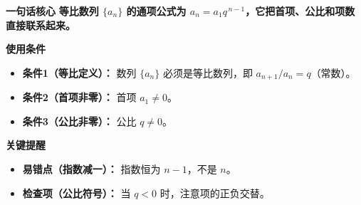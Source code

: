 \begin{summarybox}
	\textbf{\textcolor{CSummary}{一句话核心}}
	\textbf{等比数列 $\{a_n\}$ 的通项公式为 $a_n = a_1 q^{\,n-1}$，它把首项、公比和项数直接联系起来。}

	\medskip
	\textbf{\textcolor{CSummary}{使用条件}}
	\begin{itemize}[leftmargin=*, itemsep=0.5em, topsep=0.4em]
		\item \textbf{条件1（等比定义）：} 数列 $\{a_n\}$ 必须是等比数列，即 $a_{n+1} / a_n = q$（常数）。
		\item \textbf{条件2（首项非零）：} 首项 $a_1 \neq 0$。
		\item \textbf{条件3（公比非零）：} 公比 $q \neq 0$。
	\end{itemize}

	\medskip
	\textbf{\textcolor{CSummary}{关键提醒}}
	\begin{itemize}[leftmargin=*, itemsep=0.5em, topsep=0.4em]
		\item \textbf{易错点（指数减一）：} 指数恒为 $n-1$，不是 $n$。
		\item \textbf{检查项（公比符号）：} 当 $q<0$ 时，注意项的正负交替。
	\end{itemize}

\end{summarybox}
